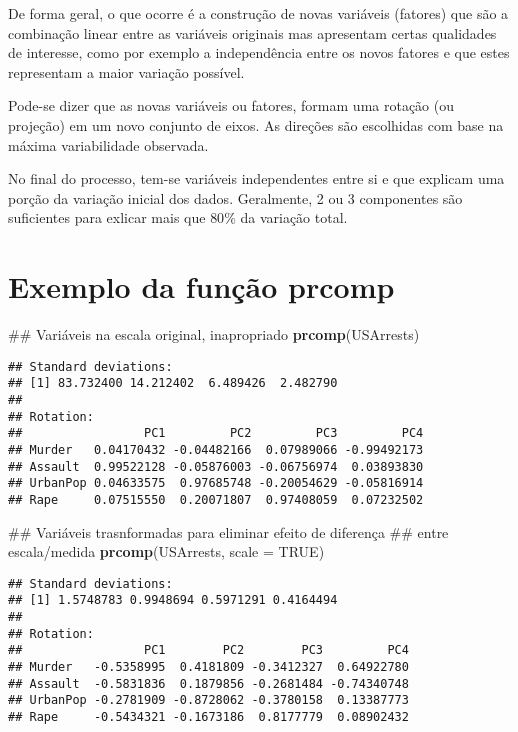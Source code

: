 \documentclass[]{book}
\newenvironment{Shaded}{\begin{snugshade}}{\end{snugshade}}
\newcommand{\KeywordTok}[1]{\textcolor[rgb]{0.13,0.29,0.53}{\textbf{{#1}}}}
\newcommand{\DataTypeTok}[1]{\textcolor[rgb]{0.13,0.29,0.53}{{#1}}}
\newcommand{\OtherTok}[1]{\textcolor[rgb]{0.56,0.35,0.01}{{#1}}}
\newcommand{\NormalTok}[1]{{#1}}
\begin{document}
De forma geral, o que ocorre é a construção de novas variáveis (fatores)
que são a combinação linear entre as variáveis originais mas apresentam
certas qualidades de interesse, como por exemplo a independência entre
os novos fatores e que estes representam a maior variação possível.

Pode-se dizer que as novas variáveis ou fatores, formam uma rotação (ou
projeção) em um novo conjunto de eixos. As direções são escolhidas com
base na máxima variabilidade observada.

No final do processo, tem-se variáveis independentes entre si e que
explicam uma porção da variação inicial dos dados. Geralmente, 2 ou 3
componentes são suficientes para exlicar mais que \(80\%\) da variação
total.

\section{Exemplo da função prcomp}\label{exemplo-da-funcao-prcomp}

\begin{Shaded}
\begin{Highlighting}[]
\NormalTok{## Variáveis na escala original, inapropriado}
\KeywordTok{prcomp}\NormalTok{(USArrests) }
\end{Highlighting}
\end{Shaded}

\begin{verbatim}
## Standard deviations:
## [1] 83.732400 14.212402  6.489426  2.482790
## 
## Rotation:
##                 PC1         PC2         PC3         PC4
## Murder   0.04170432 -0.04482166  0.07989066 -0.99492173
## Assault  0.99522128 -0.05876003 -0.06756974  0.03893830
## UrbanPop 0.04633575  0.97685748 -0.20054629 -0.05816914
## Rape     0.07515550  0.20071807  0.97408059  0.07232502
\end{verbatim}

\begin{Shaded}
\begin{Highlighting}[]
\NormalTok{## Variáveis trasnformadas para eliminar efeito de diferença}
\NormalTok{## entre escala/medida}
\KeywordTok{prcomp}\NormalTok{(USArrests, }\DataTypeTok{scale =} \OtherTok{TRUE}\NormalTok{)}
\end{Highlighting}
\end{Shaded}

\begin{verbatim}
## Standard deviations:
## [1] 1.5748783 0.9948694 0.5971291 0.4164494
## 
## Rotation:
##                 PC1        PC2        PC3         PC4
## Murder   -0.5358995  0.4181809 -0.3412327  0.64922780
## Assault  -0.5831836  0.1879856 -0.2681484 -0.74340748
## UrbanPop -0.2781909 -0.8728062 -0.3780158  0.13387773
## Rape     -0.5434321 -0.1673186  0.8177779  0.08902432
\end{verbatim}
\end{document}
